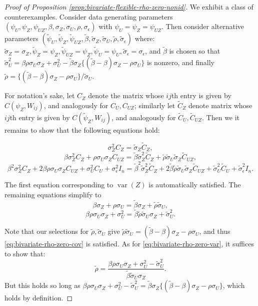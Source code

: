 \documentclass[11pt]{article}
\theoremstyle{definition}
\theoremstyle{remark}
\DeclareMathOperator{\var}{var}
\begin{document}
\begin{proof}[Proof of Proposition \ref{prop:bivariate-flexible-rho-zero-nonid}]
We exhibit a class of counterexamples. Consider data generating parameters $(\psi_U, \psi_Z, \psi_{UZ}, \beta, \sigma_Z, \sigma_U, \rho, \sigma_\epsilon)$ with $\psi_U=\psi_Z=\psi_{UZ}$. Then consider alternative parameters $(\tilde\psi_U, \tilde\psi_Z, \tilde\psi_{UZ}, \allowbreak \tilde\beta, \allowbreak \tilde\sigma_Z, \allowbreak\tilde\sigma_U, \tilde\rho, \tilde\sigma_\epsilon)$  where: $\tilde\sigma_Z = \sigma_Z, \tilde\psi_Z=\psi_Z, \tilde\psi_{UZ}=\psi_Z, \tilde\psi_U=\psi_U, \tilde\sigma_\epsilon=\sigma_\epsilon$, and $\tilde\beta$ is chosen so that $\tilde\sigma^2_U = \beta\rho\sigma_U\sigma_Z + \sigma_U^2 - \tilde\beta\sigma_Z\{(\tilde\beta-\beta)\sigma_Z-\rho\sigma_U\}$ is nonzero, and finally $\tilde\rho= \{(\tilde\beta-\beta)\sigma_Z-\rho\sigma_U\}/\tilde\sigma_U$. 

For notation's sake, let $C_Z$ denote the matrix whose $ij$th entry is given by $C(\psi_Z, W_{ij})$, and analogously for $C_U, C_{UZ}$; similarly let $\tilde C_Z$ denote matrix whose $ij$th entry is given by $C(\tilde\psi_Z, W_{ij})$, and analogously for $\tilde{C}_U, \tilde{C}_{UZ}$. Then we it remains to show that the following equations hold:

\[\sigma_Z^2 C_Z= \tilde \sigma_Z \tilde C_Z,\]
\[\beta \sigma_Z^2 C_Z + \rho \sigma_U \sigma_Z C_{UZ} =\tilde\beta \tilde\sigma_Z^2 \tilde C_Z +\tilde\rho \tilde\sigma_U \tilde\sigma_Z \tilde C_{UZ}, \]
\[\beta^2 \sigma_Z^2 C_Z + 2\beta\rho\sigma_U\sigma_Z C_{UZ} + \sigma_U^2 C_U + \sigma_\epsilon^2 I_n = \tilde\beta^2 \tilde\sigma_Z^2 \tilde C_Z + 2\tilde\beta\tilde\rho\tilde\sigma_U\tilde\sigma_Z \tilde C_{UZ} + \tilde\sigma_U^2\tilde C_U + \tilde\sigma_\epsilon^2 I_n.  \]

The first equation corresponding to $\var(Z)$ is automatically satisfied. The remaining equations simplify to
\begin{equation}\label{eq:bivariate-rho-zero-cov}
\beta \sigma_Z +\rho\sigma_U= \tilde\beta \sigma_Z + \tilde\rho \tilde\sigma_U ,
\end{equation}
\begin{equation}\label{eq:bivariate-rho-zero-var}
\beta\rho\sigma_U\sigma_Z+\sigma_U^2 = \tilde\beta\tilde\rho\tilde\sigma_U \sigma_Z + \tilde\sigma_U^2.
\end{equation}

Note that our selections for $\tilde\rho, \tilde\sigma_U$ give $\tilde\rho\tilde\sigma_U = (\tilde\beta-\beta)\sigma_Z -\rho\sigma_U$, and thus \eqref{eq:bivariate-rho-zero-cov} is satisfied. As for \eqref{eq:bivariate-rho-zero-var}, it suffices to show that:
\[\tilde\rho = \frac{\beta\rho\sigma_U\sigma_Z + \sigma_U^2-\tilde\sigma_U^2}{\tilde\beta\tilde\sigma_U \sigma_Z}.\] But this holds so long as $\beta\rho\sigma_U\sigma_Z+\sigma_U^2-\tilde\sigma_U^2 = \tilde\beta\sigma_Z\{(\tilde\beta-\beta)\sigma_Z-\rho\sigma_U\}$, which holds by definition.
\end{proof}
\end{document}
